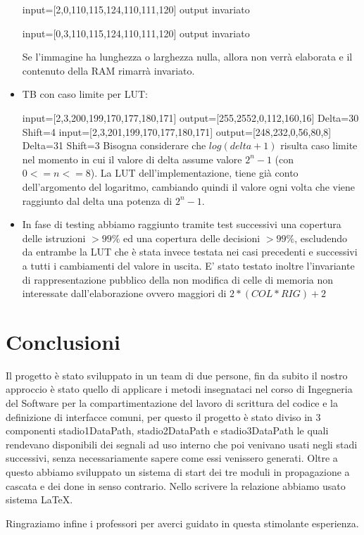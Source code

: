 \documentclass{article}
\begin{document}
\begin{itemize}
 input=[2,0,110,115,124,110,111,120] 
 output invariato
 
  input=[0,3,110,115,124,110,111,120]  
 output invariato
 
 Se l'immagine ha lunghezza o larghezza nulla, allora non verrà elaborata e il contenuto della RAM rimarrà invariato. 
\newpage
 \item TB con caso limite per LUT: 
 
  input=[2,3,200,199,170,177,180,171] 
 output=[255,2552,0,112,160,16]
 \newline
 Delta=30 Shift=4
  \newline
 input=[2,3,201,199,170,177,180,171] 
 output=[248,232,0,56,80,8]
  \newline
 Delta=31 Shift=3
  \newline
  Bisogna considerare che \(log (delta +1)\) risulta caso limite nel momento in cui il valore di delta assume valore \(2^{n}-1\) (con \(0<=n<=8\)). La LUT dell'implementazione, tiene già conto dell'argomento del logaritmo, cambiando quindi il valore ogni volta che viene raggiunto dal delta una potenza di \(2^{n}-1\).  
	\item In fase di testing abbiamo raggiunto tramite test successivi una copertura delle istruzioni \(>99\%\) ed una copertura delle decisioni \(>99\%\), escludendo da entrambe la LUT che è stata invece testata nei casi precedenti e successivi a tutti i cambiamenti del valore in uscita. E' stato testato inoltre l'invariante di rappresentazione pubblico della non modifica di celle di memoria non interessate dall'elaborazione ovvero maggiori di \(2*(COL * RIG) + 2 \)
\end{itemize}
\section{Conclusioni}
Il progetto è stato sviluppato in un team di due persone, fin da subito il nostro approccio è stato quello di applicare i metodi insegnataci nel corso di Ingegneria del Software per la compartimentazione del lavoro di scrittura del codice e la definizione di interfacce comuni, per questo il progetto è stato diviso in 3 componenti stadio1DataPath, stadio2DataPath e stadio3DataPath le quali rendevano disponibili dei segnali ad uso interno che poi venivano usati negli stadi successivi, senza necessariamente sapere come essi venissero generati. Oltre a questo abbiamo sviluppato un sistema di start dei tre moduli in propagazione a cascata e dei done in senso contrario. Nello scrivere la relazione abbiamo usato sistema LaTeX.

Ringraziamo infine i professori per averci guidato in questa stimolante esperienza.
\end{document}
